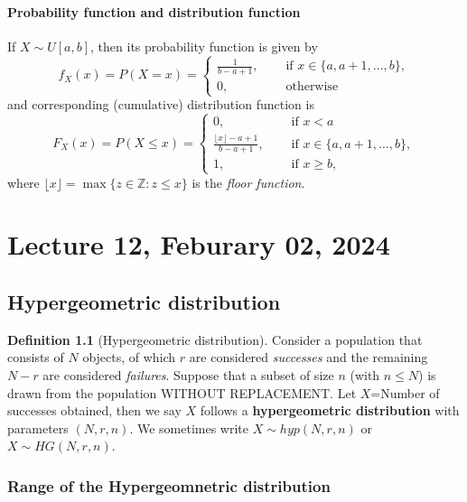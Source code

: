 \documentclass[
]{book}
\theoremstyle{definition}
\newtheorem{definition}{Definition}[chapter]
\theoremstyle{definition}
\theoremstyle{definition}
\theoremstyle{definition}
\theoremstyle{remark}
\begin{document}
\hypertarget{probability-function-and-distribution-function}{%
\subsubsection{Probability function and distribution function}\label{probability-function-and-distribution-function}}

If \(X \sim U[a,b]\), then its probability function is given by
\[
   f_X(x)= P(X = x) = \begin{cases} \frac{1}{b - a + 1}, &\quad\text{ if }x \in\{a,a+1,\dots,b\}, \\ 0, &\quad\text{ otherwise} \end{cases}   \]
and corresponding (cumulative) distribution function is
\[
   F_X(x)= P(X \leq x) = \begin{cases} 0, &\quad\text{ if } x<a\\
   \frac{\lfloor x\rfloor - a + 1}{b - a + 1}, &\quad\text{ if }x \in\{a,a+1,\dots,b\}, \\ 
   1, &\quad\text{ if } x\geq b,\end{cases}   \]
where \(\lfloor x\rfloor=\max\{z\in\mathbb{Z}: z\leq x\}\) is the \emph{floor function}.

\hypertarget{lecture-12-feburary-02-2024}{%
\chapter{Lecture 12, Feburary 02, 2024}\label{lecture-12-feburary-02-2024}}

\hypertarget{hypergeometric-distribution}{%
\section{Hypergeometric distribution}\label{hypergeometric-distribution}}

\begin{definition}[Hypergeometric distribution]
Consider a population that consists of \(N\) objects, of which \(r\) are considered \emph{successes} and the remaining \(N-r\) are considered \emph{failures}. Suppose that a subset of size \(n\) (with \(n\leq N\)) is drawn from the population WITHOUT REPLACEMENT. Let \(X\)=Number of successes obtained, then we say \(X\) follows a \textbf{hypergeometric distribution} with parameters \((N,r,n)\). We sometimes write \(X \sim hyp(N,r,n)\) or \(X\sim HG(N,r,n)\).
\end{definition}

\hypertarget{range-of-the-hypergeomnetric-distribution}{%
\subsection{Range of the Hypergeomnetric distribution}\label{range-of-the-hypergeomnetric-distribution}}
\end{document}
